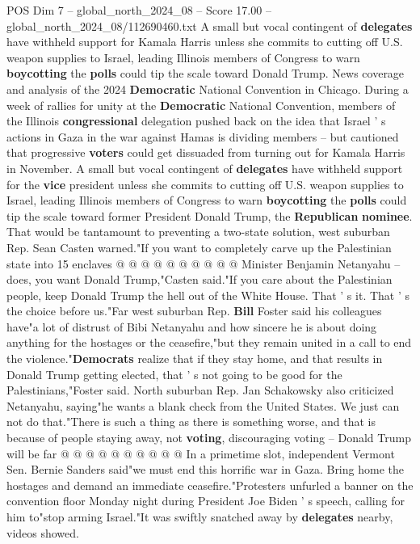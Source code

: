 \begin{textsample}{POS Dim 7 – global\_north\_2024\_08 – Score 17.00 – global\_north\_2024\_08/112690460.txt}  \label{ex:f7_pos_002}
A small but vocal contingent of \textbf{delegates} have withheld support for Kamala Harris unless she commits to cutting off U.S. weapon supplies to Israel, leading Illinois members of Congress to warn \textbf{boycotting} the \textbf{polls} could tip the scale toward Donald Trump.
News coverage and analysis of the 2024 \textbf{Democratic} National Convention in Chicago.
During a week of rallies for unity at the \textbf{Democratic} National Convention, members of the Illinois \textbf{congressional} delegation pushed back on the idea that Israel ' s actions in Gaza in the war against Hamas is dividing members -- but cautioned that progressive \textbf{voters} could get dissuaded from turning out for Kamala Harris in November.
A small but vocal contingent of \textbf{delegates} have withheld support for the \textbf{vice} president unless she commits to cutting off U.S. weapon supplies to Israel, leading Illinois members of Congress to warn \textbf{boycotting} the \textbf{polls} could tip the scale toward former President Donald Trump, the \textbf{Republican} \textbf{nominee}.
That would be tantamount to preventing a two-state solution, west suburban Rep.
Sean Casten warned."If you want to completely carve up the Palestinian state into 15 enclaves @ @ @ @ @ @ @ @ @ @ Minister Benjamin Netanyahu -- does, you want Donald Trump,"Casten said."If you care about the Palestinian people, keep Donald Trump the hell out of the White House.
That ' s it.
That ' s the choice before us."Far west suburban Rep. \textbf{Bill} Foster said his colleagues have"a lot of distrust of Bibi Netanyahu and how sincere he is about doing anything for the hostages or the ceasefire,"but they remain united in a call to end the violence."\textbf{Democrats} realize that if they stay home, and that results in Donald Trump getting elected, that ' s not going to be good for the Palestinians,"Foster said.
North suburban Rep.
Jan Schakowsky also criticized Netanyahu, saying"he wants a blank check from the United States.
We just can not do that."There is such a thing as there is something worse, and that is because of people staying away, not \textbf{voting}, discouraging voting -- Donald Trump will be far @ @ @ @ @ @ @ @ @ @ In a primetime slot, independent Vermont Sen.
Bernie Sanders said"we must end this horrific war in Gaza.
Bring home the hostages and demand an immediate ceasefire."Protesters unfurled a banner on the convention floor Monday night during President Joe Biden ' s speech, calling for him to"stop arming Israel."It was swiftly snatched away by \textbf{delegates} nearby, videos showed.

\end{textsample}
